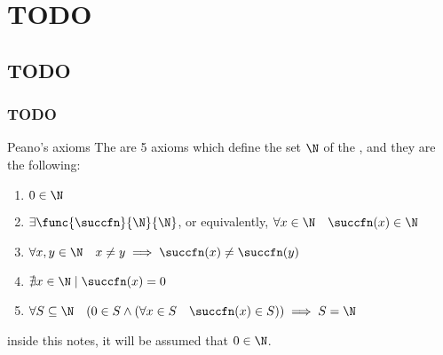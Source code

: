 \documentclass[a4paper, 12pt]{report}
\institute{\curlyquotes{\hspace{0.25mm}Sapienza} Università di Roma}
\subtitle{Appunti integrati con il libro \book}
\author{\textit{Autore}\\\authorName}
\institute{\curlyquotes{\hspace{0.25mm}Sapienza} University of Rome}
\subtitle{Lecture notes integrated with the book \book}
\author{\textit{Author}\\\authorName}
\title{\courseName}
\date{\today}
\begin{document}
    \maketitle

    {
        \hypersetup{allcolors=black}

        \romantableofcontents
    }

    \introduction


    \chapter{TODO}
    
    \section{TODO}
    
    \subsection{TODO}

    \begin{frameddefn}{Peano's axioms}
        The  are 5 axioms which define the set $\N$ of the , and they are the following:

        \begin{enumerate}[label=\roman*), font=\itshape]
            \item $0 \in \N$
            \item $\exists \func{\succfn}{\N}{\N}$, or equivalently, $\forall x \in \N \quad \succfn(x) \in \N$
            \item $\forall x, y \in \N \quad x \neq y \implies \succfn(x) \neq \succfn(y)$
            \item $\nexists x \in \N \mid \succfn(x) = 0$
            \item $\forall S \subseteq \N \quad (0 \in S \land (\forall x \in S \quad \succfn(x) \in S)) \implies S = \N$
        \end{enumerate}

         inside this notes, it will be assumed that $0 \in \N$.
    \end{frameddefn}
\end{document}
